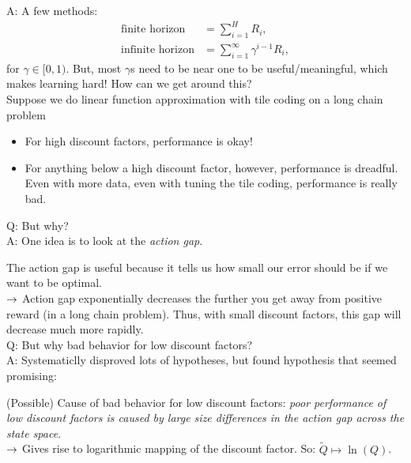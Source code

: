 A: A few methods:
\begin{align}
    \text{finite horizon} &= \sum_{i=1}^H R_i, \\
    \text{infinite horizon} &= \sum_{i=1}^\infty \gamma^{i-1} R_i,
\end{align}
for $\gamma \in [0,1)$. But, most $\gamma$s need to be near one to be useful/meaningful, which makes learning hard! How can we get around this? \\

Suppose we do linear function approximation with tile coding on a long chain problem
\begin{itemize}
    \item For high discount factors, performance is okay!
    \item For anything below a high discount factor, however, performance is dreadful. Even with more data, even with tuning the tile coding, performance is really bad.
\end{itemize}

Q: But why? \\

A: One idea is to look at the {\it action gap}.


The action gap is useful because it tells us how small our error should be if we want to be optimal. \\

$\rightarrow$ Action gap exponentially decreases the further you get away from positive reward (in a long chain problem). Thus, with small discount factors, this gap will decrease much more rapidly. \\

Q: But why bad behavior for low discount factors? \\

A: Systematiclly disproved lots of hypotheses, but found hypothesis that seemed promising:

(Possible) Cause of bad behavior for low discount factors: {\it poor performance of low discount factors is caused by large size differences in the action gap across the state space}. \\

$\rightarrow$ Gives rise to logarithmic mapping of the discount factor. So: $\tilde{Q} \mapsto \ln(Q)$. \\

